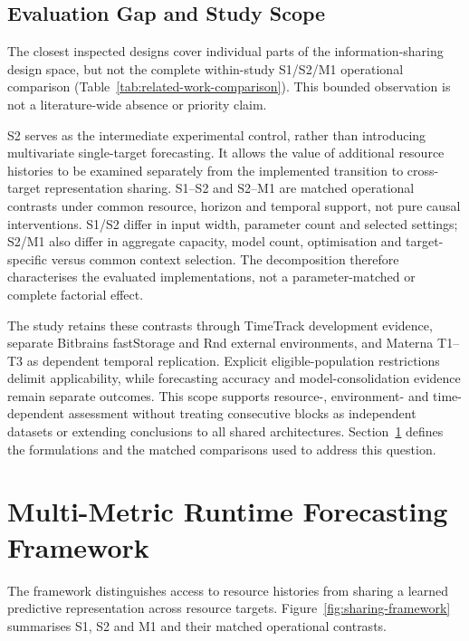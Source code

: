 \documentclass[a4paper,fleqn]{cas-dc}
\begin{document}
\subsection{Evaluation Gap and Study Scope}
\label{sec:rw-gap}

The closest inspected designs cover individual parts of the
information-sharing design space, but not the complete within-study S1/S2/M1
operational comparison (Table~\ref{tab:related-work-comparison}). This
bounded observation is not a literature-wide absence or priority claim.



S2 serves as the intermediate experimental control, rather than introducing
multivariate single-target forecasting. It allows the value of additional
resource histories to be examined separately from the implemented transition
to cross-target representation sharing. S1--S2 and S2--M1 are matched
operational contrasts under common resource, horizon and temporal support,
not pure causal interventions. S1/S2 differ in input width, parameter count
and selected settings; S2/M1 also differ in aggregate capacity, model count,
optimisation and target-specific versus common context selection. The
decomposition therefore characterises the evaluated implementations, not a
parameter-matched or complete factorial effect.

The study retains these contrasts through TimeTrack development evidence,
separate Bitbrains fastStorage and Rnd external environments, and Materna
T1--T3 as dependent temporal replication. Explicit eligible-population
restrictions delimit applicability, while forecasting accuracy and
model-consolidation evidence remain separate outcomes. This scope supports
resource-, environment- and time-dependent assessment without treating
consecutive blocks as independent datasets or extending conclusions to all
shared architectures. Section~\ref{sec:framework} defines the formulations
and the matched comparisons used to address this question.

\section{Multi-Metric Runtime Forecasting Framework}
\label{sec:framework}

The framework distinguishes access to resource histories from sharing a
learned predictive representation across resource targets.
Figure~\ref{fig:sharing-framework} summarises S1, S2 and M1 and their matched
operational contrasts.
\end{document}
